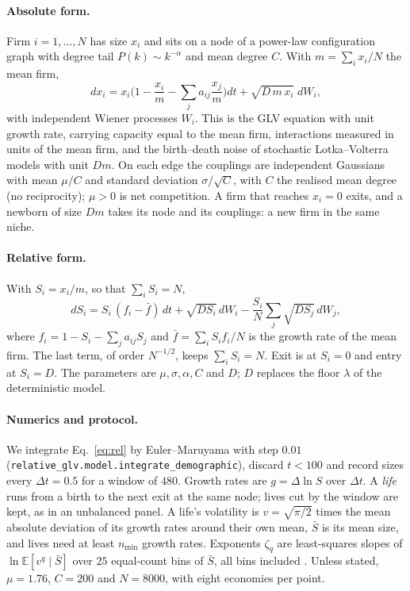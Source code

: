 \documentclass[pre,twocolumn,superscriptaddress,nofootinbib]{revtex4-2}
\newcommand{\E}{\mathbb E}
\newcommand{\Sb}{\bar S}
\begin{document}
\paragraph{Absolute form.}  Firm $i=1,\dots,N$ has size $x_i$ and sits on a node of a power-law
configuration graph with degree tail $P(k)\sim k^{-\alpha}$ and mean degree $C$.  With $m=\sum_ix_i/N$
the mean firm,
\begin{equation}
dx_i=x_i\Big(1-\frac{x_i}{m}-\sum_ja_{ij}\frac{x_j}{m}\Big)dt+\sqrt{D\,m\,x_i}\;dW_i ,
\label{eq:abs}
\end{equation}
with independent Wiener processes $W_i$.  This is the GLV equation with unit growth rate,
carrying capacity equal to the mean firm, interactions measured in units of the mean firm, and
the birth--death noise of stochastic Lotka--Volterra models \cite{altieri2021} with unit $Dm$.
On each edge the couplings are independent Gaussians with mean $\mu/C$ and standard deviation
$\sigma/\sqrt C$, with $C$ the realised mean degree (no reciprocity); $\mu>0$ is net competition.  A firm that reaches $x_i=0$ exits, and a newborn of size $Dm$
takes its node and its couplings: a new firm in the same niche.

\paragraph{Relative form.}  With $S_i=x_i/m$, so that $\sum_iS_i=N$,
\begin{equation}
dS_i=S_i\,(f_i-\bar f)\,dt+\sqrt{DS_i}\,dW_i-\frac{S_i}{N}\sum_j\sqrt{DS_j}\,dW_j ,
\label{eq:rel}
\end{equation}
where $f_i=1-S_i-\sum_ja_{ij}S_j$ and $\bar f=\sum_iS_if_i/N$ is the growth rate of the mean firm.  The
last term, of order $N^{-1/2}$, keeps $\sum_iS_i=N$.  Exit is at $S_i=0$ and entry at $S_i=D$.  The
parameters are $\mu,\sigma,\alpha,C$ and $D$; $D$ replaces the floor $\lambda$ of the deterministic
model.

\paragraph{Numerics and protocol.}  We integrate Eq.~\eqref{eq:rel} by Euler--Maruyama with step
$0.01$ (\texttt{relative\_glv.model.integrate\_demographic}), discard $t<100$ and record sizes
every $\Delta t=0.5$ for a window of $480$.  Growth rates are $g=\Delta\ln S$ over $\Delta t$.  A
\emph{life} runs from a birth to the next exit at the same node; lives cut by the window are kept,
as in an unbalanced panel.  A life's volatility is $v=\sqrt{\pi/2}$ times the mean absolute
deviation of its growth rates around their own mean, $\Sb$ is its mean size, and lives need at
least $n_{\min}$ growth rates.  Exponents $\zeta_q$ are least-squares slopes of $\ln\E[v^q\mid\Sb]$ over
$25$ equal-count bins of $\Sb$, all bins included \cite{moran2024}.  Unless stated, $\mu=1.76$,
$C=200$ and $N=8000$, with eight economies per point.
\end{document}

